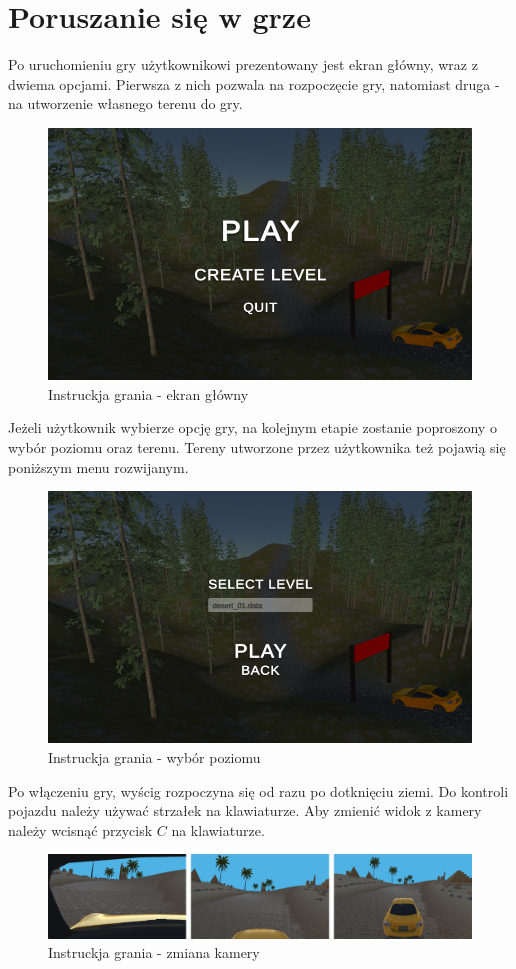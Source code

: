 \section{Poruszanie się w grze}
    Po uruchomieniu gry użytkownikowi prezentowany jest ekran główny, wraz z dwiema opcjami. Pierwsza z nich pozwala na rozpoczęcie gry, 
    natomiast druga - na utworzenie własnego terenu do gry.
    \begin{figure}[H]
        \centering
        \includegraphics[width=.6\textwidth]{figures/game_instruction_start.png}
        \caption{Instruckja grania - ekran główny}
        \label{fig}
    \end{figure}
    Jeżeli użytkownik wybierze opcję gry, na kolejnym etapie zostanie poproszony o wybór poziomu oraz terenu. 
    Tereny utworzone przez użytkownika też pojawią się poniższym menu rozwijanym.
    \begin{figure}[H]
        \centering
        \includegraphics[width=.6\textwidth]{figures/game_instruction_choose_level.png}
        \caption{Instruckja grania - wybór poziomu}
        \label{fig}
    \end{figure}
    Po włączeniu gry, wyścig rozpoczyna się od razu po dotknięciu ziemi. Do kontroli pojazdu należy używać strzałek na klawiaturze.
    Aby zmienić widok z kamery należy wcisnąć przycisk $C$ na klawiaturze.
    \begin{figure}[H]
        \centering
        \includegraphics[width=\textwidth]{figures/game_instruction_camera_switch.png}
        \caption{Instruckja grania - zmiana kamery}
        \label{fig}
    \end{figure}
